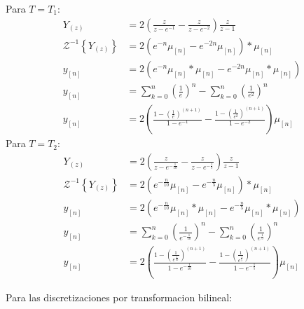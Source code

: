 \documentclass[a4paper,12pt]{report}
\begin{document}
\begin{enumerate}[label=\alph*), left=0pt]
                Para $T = T_1$:
                \begin{align*}
                    Y_{(z)} &= 2\left(\frac{z}{z - e^{-1}} - \frac{z}{z - e^{-2}} \right) \frac{z}{z-1}\\
                    \mathcal{Z}^{-1}\left\{Y_{(z)}\right\} &= 2\left(e^{-n} \mu_{[n]} - e^{-2 n} \mu_{[n]}\right) * \mu_{[n]}\\
                    y_{[n]} &= 2\left(e^{-n} \mu_{[n]} * \mu_{[n]} - e^{-2 n} \mu_{[n]} * \mu_{[n]}\right)\\
                    y_{[n]} &= \sum_{k=0}^n \left(\frac{1}{e}\right)^{n} - \sum_{k=0}^n \left(\frac{1}{e^2}\right)^{n}\\
                    y_{[n]} &= 2\left( \frac{1 - \left(\frac{1}{e}\right)^{(n+1)}}{1 - e^{-1}} - \frac{1 - \left(\frac{1}{e^2}\right)^{(n+1)}}{1 - e^{-2}} \right) \mu_{[n]}
                \end{align*}
                Para $T = T_2$:
                \begin{align*}
                    Y_{(z)} &= 2\left(\frac{z}{z - e^{-\frac{1}{10}}} - \frac{z}{z - e^{-\frac{1}{5}}} \right) \frac{z}{z-1}\\
                    \mathcal{Z}^{-1}\left\{Y_{(z)}\right\} &= 2\left(e^{-\frac{n}{10}} \mu_{[n]} - e^{-\frac{n}{5}} \mu_{[n]}\right) * \mu_{[n]}\\
                    y_{[n]} &= 2\left(e^{-\frac{n}{10}} \mu_{[n]} * \mu_{[n]} - e^{-\frac{n}{5}} \mu_{[n]} * \mu_{[n]}\right)\\
                    y_{[n]} &= \sum_{k=0}^n \left(\frac{1}{e^{-\frac{1}{10}}}\right)^{n} - \sum_{k=0}^n \left(\frac{1}{e^{\frac{1}{5}}}\right)^{n}\\
                    y_{[n]} &= 2\left( \frac{1 - \left(\frac{1}{e^{\frac{1}{10}}}\right)^{(n+1)}}{1 - e^{-{\frac{1}{10}}}} - \frac{1 - \left(\frac{1}{e^{\frac{1}{5}}}\right)^{(n+1)}}{1 - e^{-\frac{1}{5}}} \right) \mu_{[n]}
                \end{align*}

                Para las discretizaciones por transformacion bilineal:


\end{enumerate}
\end{document}

